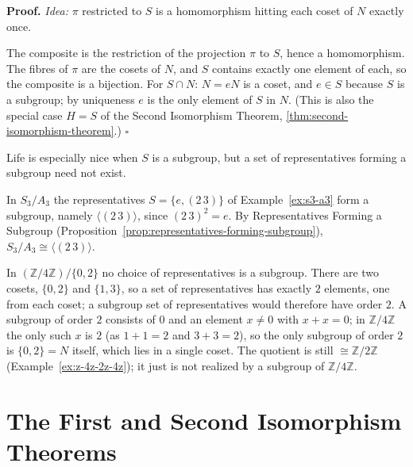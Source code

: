 \documentclass[11pt]{report}
\renewenvironment{proof}[1][Proof]{\noindent\textbf{#1.} }{\hfill$\square$\par\vspace{5pt}}
\begin{document}
\begin{proof}
\textit{Idea:} $\pi$ restricted to $S$ is a homomorphism hitting each coset of $N$ exactly once.\par
The composite is the restriction of the projection $\pi$ to $S$, hence a homomorphism. The fibres of $\pi$ are the cosets of $N$, and $S$ contains exactly one element of each, so the composite is a bijection. For $S \cap N$: $N = eN$ is a coset, and $e \in S$ because $S$ is a subgroup; by uniqueness $e$ is the only element of $S$ in $N$. (This is also the special case $H = S$ of the Second Isomorphism Theorem, \ref{thm:second-isomorphism-theorem}.)
\end{proof}

Life is especially nice when $S$ is a subgroup, but a set of representatives forming a subgroup need not exist.

\begin{exbox}\label{ex:representatives-s3-a3-subgroup-23}
In $S_3/A_3$ the representatives $S = \{e, (2\,3)\}$ of Example~\ref{ex:s3-a3} form a subgroup, namely $\langle (2\,3) \rangle$, since $(2\,3)^2 = e$. By Representatives Forming a Subgroup (Proposition~\ref{prop:representatives-forming-subgroup}), $S_3/A_3 \cong \langle (2\,3) \rangle$.
\end{exbox}

\begin{exbox}\label{ex:representatives-z4-no-subgroup}
In $(\mathbb{Z}/4\mathbb{Z})/\{0, 2\}$ no choice of representatives is a subgroup. There are two cosets, $\{0, 2\}$ and $\{1, 3\}$, so a set of representatives has exactly $2$ elements, one from each coset; a subgroup set of representatives would therefore have order $2$. A subgroup of order $2$ consists of $0$ and an element $x \neq 0$ with $x + x = 0$; in $\mathbb{Z}/4\mathbb{Z}$ the only such $x$ is $2$ (as $1 + 1 = 2$ and $3 + 3 = 2$), so the only subgroup of order $2$ is $\{0, 2\} = N$ itself, which lies in a single coset. The quotient is still $\cong \mathbb{Z}/2\mathbb{Z}$ (Example~\ref{ex:z-4z-2z-4z}); it just is not realized by a subgroup of $\mathbb{Z}/4\mathbb{Z}$.
\end{exbox}




\section{The First and Second Isomorphism Theorems}\label{sec:first-iso}
\end{document}
